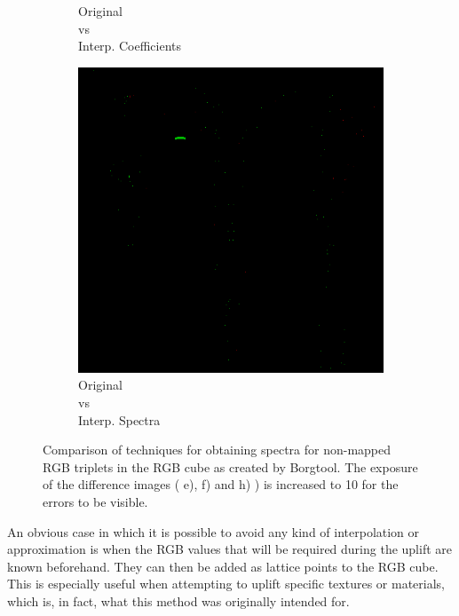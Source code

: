 \begin{figure}[t]
\begin{subfigure}[t]{0.22\textwidth}
	\caption{Original\\vs\\Interp. Coefficients}
	\label{fig:sigDiffSpectraCoeffs}
	\end{subfigure}\hspace{0.05em}
	\begin{subfigure}[t]{0.22\textwidth}
	\includegraphics[width=\linewidth]{img/uplifting_diff_originalSpectra.png}
	\caption{Original\\vs\\Interp. Spectra}
	\label{fig:sigDiffOrigSpectra}
	\end{subfigure}
	\caption{Comparison of techniques for obtaining spectra for non-mapped RGB triplets in the RGB cube as created by Borgtool. The exposure of the difference images ( e), f) and h) ) is increased to 10 for the errors to be visible.}
	\label{fig:sigmoidTexture}
\end{figure}

An obvious case in which it is possible to avoid any kind of interpolation or approximation is when the RGB values that will be required during the uplift are known beforehand. They can then be added as lattice points to the RGB cube. This is especially useful when attempting to uplift specific textures or materials, which is, in fact, what this method was originally intended for.

